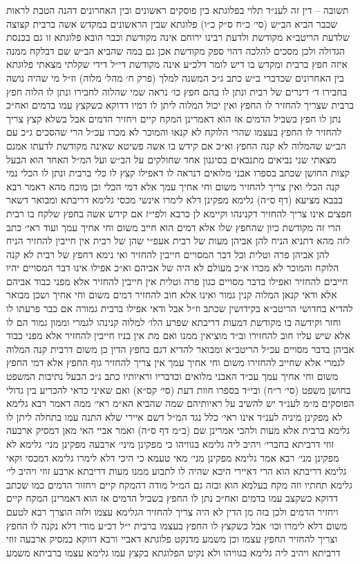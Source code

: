 \documentclass[12pt, openany]{book}
\begin{document}
\begin{multicols}{2}
תשובה – דין זה לענ״ד תלוי בפלוגתא בין פוסקים ראשונים ובין האחרונים דהנה הטבת לראות שכבר הביא הב״ש (סי׳ כ״ח ס״ק כ״ו) פלוגתא שבין הראשונים במקדש אשה ברבית קצוצה שלדעת הריטב״א מקודשת ולדעת רבינו ירוחם אינה מקודשת וכבר הובא פלוגתא זו גם בכנסת הגדולה ולכן מסכים להלכה דהוי ספק מקודשת אכן גם במה שהביא הב״ש שם דבלקח ממנה איזה חפץ ברבית ומקדש בו דיש לומר דלכ״ע אינה מקודשת די״ל דידי שקלתי מצאתי פלוגתא בין האחרונים שכדברי ב״ש כתב ג״כ המשנה למלך (פרק ח׳ מהל׳ מלוה) וז״ל מי שהיה נושה בחבירו ד׳ דינרים של רבית ונתן לו בהם חפץ כו׳ נראה שמי שהלוה לחבירו ונתן לו הלוה חפץ ברבית שצריך להחזיר לו החפץ ואין יכול המלוה ליתן לו דמיו דדוקא כשקצץ עמו בדמים ואח״כ נתן לו חפץ בשביל הדמים אז הוא דאמרינן המקח קיים ויחזיר הדמים אבל בשלא קצץ צריך להחזיר לו החפץ בעצמו שהרי הלוקח לא קנאו והמוכר לא מכרו עכ״ל הרי שהסכים ג״כ עם הב״ש שהמלוה לא קנה החפץ וא״כ אם קידש בו אשה פשיטא שאינה מקודשת לדעתו אמנם מצאתי שני נביאים מתנבאים בסיגנון אחד שחולקים על הב״ש ועל המ״ל האחד הוא הבעל קצות החושן שכתב בספרו אבני מלואים דנראה לו דאפילו קצץ לו כלי ברבית ונתן לו הכלי נמי קנה הכלי ואין צריך להחזיר משום וחי אחיך עמך אלא דמי הכלי וכן מוכח מהא דאמר רבא בבבא מציעא (דף ס״ה) גלימא מפקינן דלא לימרו אינשי מכסי גלימא דריבתא ומבואר דשאר חפצים אינו צריך להחזיר דקנינהו וקיימא לן כרבא ולפי״ז אם קידש אשה בחפץ שלקח בו רבית הרי זה מקודשת כיון שהחפץ שלו אלא דמים הוא חייב משום וחי אחיך עמך ועוד ראי׳ כתב לזה מהא דתניא הניח להן אביהן מעות של רבית אעפ״י שהן של רבית אין חייבין להחזיר הניח להן אביהן פרה וטלית וכל דבר המסויים חייבין להחזיר ואי נימא דחפץ של רבית לא קנה הלוקח והמוכר לא מכרו א״כ מעולם לא היה של אביהם וא״כ אפילו אינו דבר המסויים יהיו חייבים להחזיר ואפילו בדבר מסויים כגון פרה וטלית אין חייבין להחזיר אלא מפני כבוד אביהם אלא ודאי קנאן המלוה קנין גמור ואינו אלא חוב להחזיר דמים משום וחי אחיך ושכן מבואר להדיא בחדושי הריטב״א בקידושין שכתב וז״ל אבל ודאי אפילו ברבית גמורה אם כבר פרעתו לו וחזר וקידשה בו מקודשת דמעות דריבתא שפרע הלו׳ למלוה קנינהו לגמרי וממון גמור הם לו אלא שיש עליו חוב להחזירו וב״ד מוציאין ממנו ואם מת אין בניו חייבין להחזיר אלא מפני כבוד אביהן בדבר מסויים עכ״ל הריטב״א ומבואר להדיא דגם בחפץ הדין כן משום דרבית קנה המלוה לגמרי אלא שחייב להחזירו משום וחי אחיך עמך אין צריך להחזיר גוף החפץ אלא דמי החפץ משום וחי אחיך עמך עכ״ד האבני מלואים וכדבריו וראיותיו כתב ג״כ הבעל נתיבות המשפט בחושן משפט (סי׳ ר״ח) ובי״ד בספרו חוות דעת (סי׳ קס״א) ואם שאיני כדאי להכריע בין גדולי הפוסקים מ״מ לענ״ד יש להשיב על ראיותיהם שמה שהביא הא״מ ראי׳ ממה דאמר רבא גלימא לא מפקינן מיניה לענ״ד אינו ראי׳ כלל נגד המ״ל דשם איירי שלא התנה עמו בתחלה ליתן לו גלימא ברבית אלא מעות ולהכי אמרינן שם (ב״מ דף ס״ה) ואמר אביי האי מאן דמסיק ארבעה זוזי דרביתא בחברי׳ ויהיב ליה גלימא בגוויהו כי מפקינן מיני׳ ארבעה מפקינן מני׳ גלימא לא מפקינן מני׳ רבא אמר גלימא מפקינן מני׳ מאי טעמא כי היכי דלא לימרו גלימא דמכסי וקאי גלימא דריבתא הוא הרי דאיירי היכא שהיה לו לתבוע ממנו מעות דריבתא ארבע זוזי ויהיב לי׳ גלימא תחתיו וזה מקח בעלמא הוא ובזה גם המ״ל מודה דהמקח קיים ויחזור הדמים כמו שכתב דדוקא כשקצב עמו בדמים ואח״כ נתן לו החפץ בשביל הדמים אז הוא דאמרינן המקח קיים ויחזיר הדמים ולכן בזה מן הדין לא היה צריך להחזיר הגלימא עצמו ולזה הוצרך רבא לטעם משום דלא לימרו וכו׳ אבל כשקצץ לו החפץ בעצמו ברבית י״ל דכ״ע מודי דלא נקנה לו החפץ וצריך להחזיר החפץ עצמו וכן משמע מדנקט פלוגתא דאביי ורבא דווקא במסיק ארבעה זוזי דרביתא ויהיב ליה גלימא בגוויהו ולא נקיט הפלוגתא בקצץ עמו גלימא עצמו ברביתא משמע 
\end{multicols}
\end{document}
